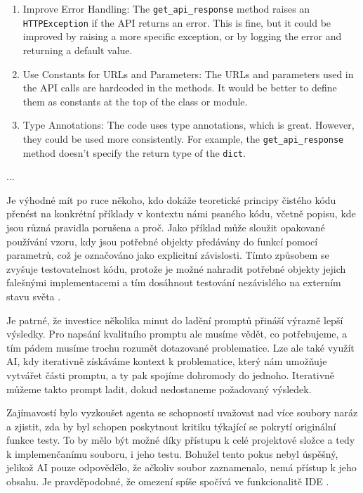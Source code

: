 \documentclass[FM,DP]{tulthesis}
\begin{document}
\begin{tcolorbox}[colback=white,colframe=black]
\begin{enumerate}
				\item Improve Error Handling: The \verb|get_api_response| method raises an \verb|HTTPException| if the API returns an error. This is fine, but it could be improved by raising a more specific exception, or by logging the error and returning a default value.
				
				\item Use Constants for URLs and Parameters: The URLs and parameters used in the API calls are hardcoded in the methods. It would be better to define them as constants at the top of the class or module.
				
				\item Type Annotations: The code uses type annotations, which is great. However, they could be used more consistently. For example, the \verb|get_api_response| method doesn't specify the return type of the \verb|dict|.
			\end{enumerate}
			... \cite{call_api}
		\end{tcolorbox}

		Je výhodné mít po ruce někoho, kdo dokáže teoretické principy čistého kódu přenést na konkrétní příklady v kontextu námi psaného kódu, včetně popisu, kde jsou různá pravidla porušena a proč. Jako příklad může sloužit opakované používání vzoru, kdy jsou potřebné objekty předávány do funkcí pomocí parametrů, což je označováno jako explicitní závislosti. Tímto způsobem se zvyšuje testovatelnost kódu, protože je možné nahradit potřebné objekty jejich falešnými implementacemi a tím dosáhnout testování nezávislého na externím stavu světa \cite{msft:dependency}.
		
		Je patrné, že investice několika minut do ladění promptů přináší výrazně lepší výsledky. Pro napsání kvalitního promptu ale musíme vědět, co potřebujeme, a tím pádem musíme trochu rozumět dotazované problematice. Lze ale také využít AI, kdy iterativně získáváme kontext k problematice, který nám umožňuje vytvářet části promptu, a ty pak spojíme dohromody do jednoho. Iterativně můžeme takto prompt ladit, dokud nedostaneme požadovaný výsledek.
		
		Zajímavostí bylo vyzkoušet agenta se schopností uvažovat nad více soubory naráz a zjistit, zda by byl schopen poskytnout kritiku týkající se pokrytí originální funkce testy. To by mělo být možné díky přístupu k celé projektové složce a tedy k implemenčanímu souboru, i jeho testu. Bohužel tento pokus nebyl úspěšný, jelikož AI pouze odpovědělo, že ačkoliv soubor zaznamenalo, nemá přístup k jeho obsahu. Je pravděpodobné, že omezení spíše spočívá ve funkcionalitě IDE \cite{agent_coverage}.
		
\end{document}
